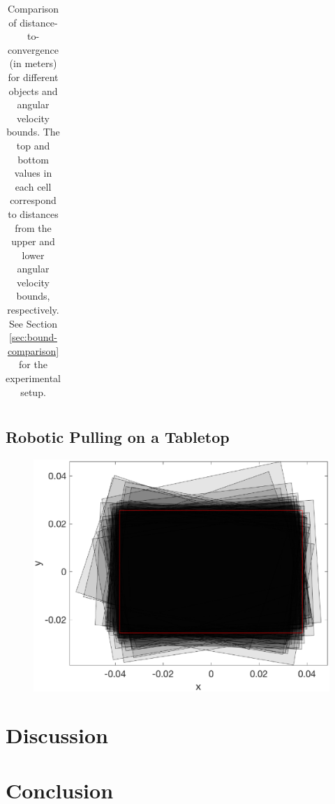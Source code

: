\documentclass[conference]{IEEEtran}
\begin{document}
\begin{table}
\begin{center}
\begin{tabular}[c]{cccc}
        \bottomrule
      \end{tabular}
  \end{center}
  \caption{Comparison of distance-to-convergence (in meters) for different objects and angular velocity bounds. The top and bottom values in each cell correspond to distances from the upper and lower angular velocity bounds, respectively. See Section \ref{sec:bound-comparison} for the experimental setup.}
  \label{table:convergence-distance}
\end{table}

\subsection{Robotic Pulling on a Tabletop}
\begin{figure}
\begin{center}
  \includegraphics[width=\columnwidth]{fig/superimposed.eps}
\end{center}
\caption{}
\label{fig:}
\end{figure}





\section{Discussion}

\section{Conclusion}



\end{document}
